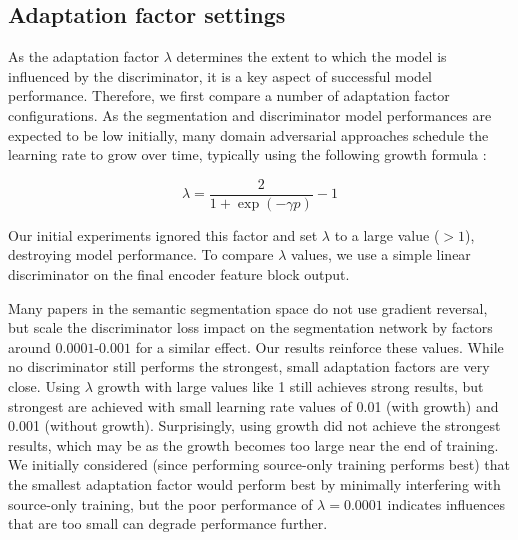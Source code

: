 \documentclass[a4paper,12pt]{report}
\begin{document}
\subsection{Adaptation factor settings}
As the adaptation factor $\lambda$ determines the extent to which the model is influenced by the discriminator, it is a key aspect of successful model performance. Therefore, we first compare a number of adaptation factor configurations. As the segmentation and discriminator model performances are expected to be low initially, many domain adversarial approaches schedule the learning rate to grow over time, typically using the following growth formula \cite{ganin_domain-adversarial_2016}:

\begin{equation}
    \lambda = \frac{2}{1 + \exp(-\gamma p)} - 1
\end{equation}

Our initial experiments ignored this factor and set $\lambda$ to a large value ($>1$), destroying model performance. To compare $\lambda$ values, we use a simple linear discriminator on the final encoder feature block output.

Many papers in the semantic segmentation space do not use gradient reversal, but scale the discriminator loss impact on the segmentation network by factors around $0.0001$-$0.001$ for a similar effect. Our results reinforce these values. While no discriminator still performs the strongest, small adaptation factors are very close. Using $\lambda$ growth with large values like 1 still achieves strong results, but strongest are achieved with small learning rate values of 0.01 (with growth) and 0.001 (without growth). Surprisingly, using growth did not achieve the strongest results, which may be as the growth becomes too large near the end of training. We initially considered (since performing source-only training performs best) that the smallest adaptation factor would perform best by minimally interfering with source-only training, but the poor performance of $\lambda = 0.0001$ indicates influences that are too small can degrade performance further.
\end{document}

